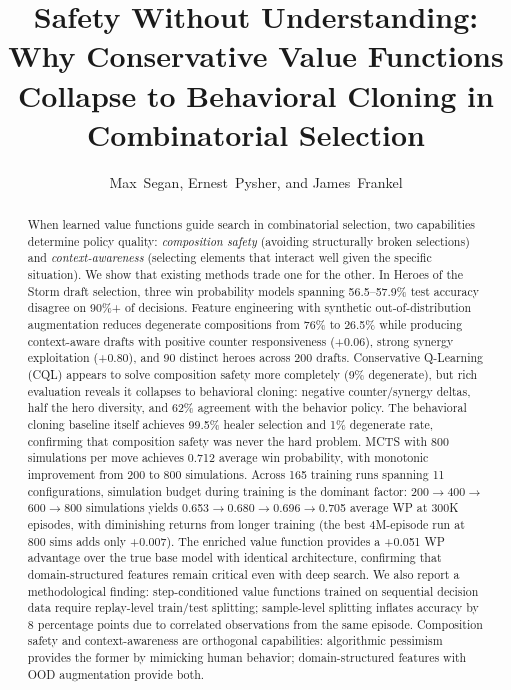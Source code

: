 \documentclass[journal]{IEEEtran}
\begin{document}
\title{Safety Without Understanding: Why Conservative Value Functions Collapse to Behavioral Cloning in Combinatorial Selection}
\author{Max~Segan, Ernest~Pysher, and James~Frankel}
\maketitle

\begin{abstract}
When learned value functions guide search in combinatorial selection, two capabilities determine policy quality: \textit{composition safety} (avoiding structurally broken selections) and \textit{context-awareness} (selecting elements that interact well given the specific situation). We show that existing methods trade one for the other. In Heroes of the Storm draft selection, three win probability models spanning 56.5--57.9\% test accuracy disagree on 90\%+ of decisions. Feature engineering with synthetic out-of-distribution augmentation reduces degenerate compositions from 76\% to 26.5\% while producing context-aware drafts with positive counter responsiveness (+0.06), strong synergy exploitation (+0.80), and 90 distinct heroes across 200 drafts. Conservative Q-Learning (CQL) appears to solve composition safety more completely (9\% degenerate), but rich evaluation reveals it collapses to behavioral cloning: negative counter/synergy deltas, half the hero diversity, and 62\% agreement with the behavior policy. The behavioral cloning baseline itself achieves 99.5\% healer selection and 1\% degenerate rate, confirming that composition safety was never the hard problem. MCTS with 800 simulations per move achieves 0.712 average win probability, with monotonic improvement from 200 to 800 simulations. Across 165 training runs spanning 11 configurations, simulation budget during training is the dominant factor: 200$\to$400$\to$600$\to$800 simulations yields 0.653$\to$0.680$\to$0.696$\to$0.705 average WP at 300K episodes, with diminishing returns from longer training (the best 4M-episode run at 800 sims adds only +0.007). The enriched value function provides a +0.051 WP advantage over the true base model with identical architecture, confirming that domain-structured features remain critical even with deep search. We also report a methodological finding: step-conditioned value functions trained on sequential decision data require replay-level train/test splitting; sample-level splitting inflates accuracy by 8 percentage points due to correlated observations from the same episode. Composition safety and context-awareness are orthogonal capabilities: algorithmic pessimism provides the former by mimicking human behavior; domain-structured features with OOD augmentation provide both.
\end{abstract}
\end{document}
